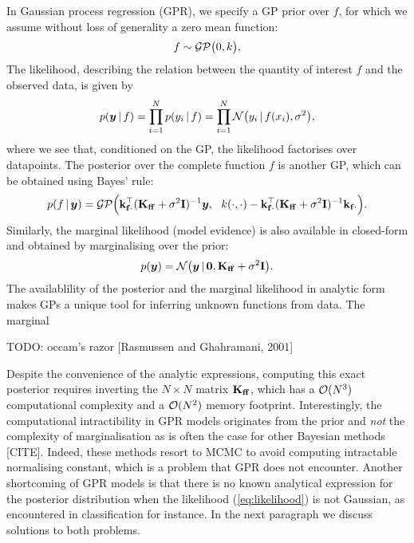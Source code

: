 In Gaussian process regression (GPR), we specify a GP prior over $f$, for which we assume without loss of generality a zero mean function:
\begin{equation}
  f \sim \mathcal{GP}\big(0, k\big),
\end{equation}
The likelihood, describing the relation between the quantity of interest $f$ and the observed data, is given by 
\begin{equation}
  \label{eq:likelihood}
  p(\vy \given f) = \prod_{i=1}^N p(y_i \given f) = \prod_{i=1}^N \NormDist{y_i \given f(x_i), \sigma^2},
\end{equation}
where we see that, conditioned on the GP, the likelihood factorises over datapoints. The posterior over the complete function $f$ is another GP, which can be obtained using Bayes' rule:
\begin{equation}
  \label{eq:f-given-y}
  p(f \,|\, \bm{y}) 
      = \mathcal{GP}\Big(\mathbf{k}_{\mathbf{f} \cdot}^\top (\mathbf{{K}}_{\mathbf{f} \mathbf{f}} + \sigma^2 \mathbf{{I}})^{-1} \bm{y},\ \ k(\cdot, \cdot) -  \mathbf{k}_{\mathbf{f} \cdot}^\top (\mathbf{{K}}_{\mathbf{f} \mathbf{f}} + \sigma^2 \mathbf{{I}})^{-1} \mathbf{k}_{\mathbf{f} \cdot}\Big).
\end{equation}
Similarly, the marginal likelihood (model evidence) is also available in closed-form and obtained by marginalising over the prior:
\begin{equation}
  \label{eq:log-marginal-likelihood}
  p(\vy) = \NormDist{\vy \given \vzero, \Kff + \sigma^2 \Eye}.
\end{equation}
The availablility of the posterior and the marginal likelihood in analytic form makes GPs a unique tool for inferring unknown functions from data. The marginal 

TODO: occam's razor [Rasmussen and Ghahramani, 2001]

Despite the convenience of the analytic expressions, computing this exact posterior requires inverting the $N \times N$ matrix $\Kff$, which has a $\mathcal{O}(N^3)$ computational complexity and a $\mathcal{O}(N^2)$ memory footprint. Interestingly, the computational intractibility in GPR models originates from the prior and \emph{not} the complexity of marginalisation as is often the case for other Bayesian methods [CITE]. Indeed, these methods resort to MCMC to avoid computing intractable normalising constant, which is a problem that GPR does not encounter.  Another shortcoming of GPR models is that there is no known analytical expression for the posterior distribution when the likelihood (\cref{eq:likelihood}) is not Gaussian, as encountered in classification for instance. In the next paragraph we discuss solutions to both problems.

